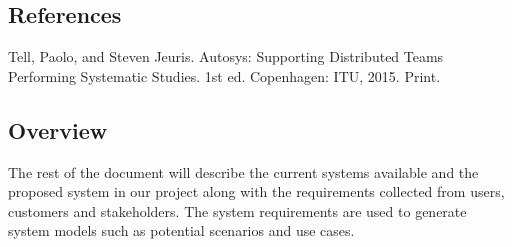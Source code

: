 \subsection{References}
Tell, Paolo, and Steven Jeuris. Autosys: Supporting Distributed Teams Performing Systematic Studies. 1st ed. Copenhagen: ITU, 2015. Print.

\subsection{Overview}
The rest of the document will describe the current systems available and the proposed system in our project along with the requirements collected from users, customers and stakeholders. The system requirements are used to generate system models such as potential scenarios and use cases. 
